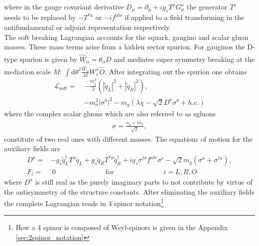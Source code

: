 where in the gauge covariant derivative $D_\mu = \partial_\mu +ig_sT^aG^a_\mu$ the generator $T^a$ needs to be replaced by $-T^{\ast a}$ or $-if^{abc}$ if applied to a field transforming in the antifundamental or adjoint representation respectively.\\
The soft breaking Lagrangian accounts for the squark, gaugino and scalar gluon masses. These mass terms arise from a hidden sector spurion. For gauginos the D-type spurion is given by $\hat{W}_\alpha^\prime = \theta_\alpha D$ and mediates super symmetry breaking at the mediation scale $M$: $\int\mathrm{d}\theta^2\frac{\hat{W}_\alpha^\prime}{M}W_s^\alpha \hat{O}$. After integrating out the spurion one obtains\cite{Fox:2002bu, Diessner:2015bna}
\begin{align}
\mathcal{L}_{\mathrm{soft}} =\ & -\frac{m_{\tilde{q}}^2}{2}(|\tilde{q}_L|^2 + |\tilde{q}_R|^2),\nonumber\\
& -m_{\sigma}^2\left|\sigma^{a}\right|^2 - m_g(\lambda\chi -\sqrt{2}D^a \sigma^a + h.c.)
\end{align}
where the complex scalar gluons which are also referred to as sgluons
\begin{align}
\sigma = \frac{\phi_0 + i\sigma_0}{\sqrt{2}},
\end{align}
constitute of two real ones with different masses.
The equations of motion for the auxiliary fields are
\begin{align}
D^a =& -g_s \tilde{q}_L^\dagger T^a \tilde{q}_L + g_s \tilde{q}_R T^{\ast a} \tilde{q}_R^\dagger + ig_s\sigma^{\dagger b}f^{abc}\sigma^c -\sqrt{2}m_g(\sigma^a + \sigma^{\dagger a}),\\
F_i =&\ 0 \hspace{3cm} \mathrm{for} \hspace{3cm} i = L,R,O
\end{align}
where $D^a$ is still real as the purely imaginary parts to not contribute by virtue of the antisymmetry of the structure constants. After eliminating the auxiliary fields the complete Lagrangian reads in 4 spinor notation\footnote{How a 4 spinor is composed of Weyl-spinors is given in the Appendix \ref{sec:2spinor_notation}}
